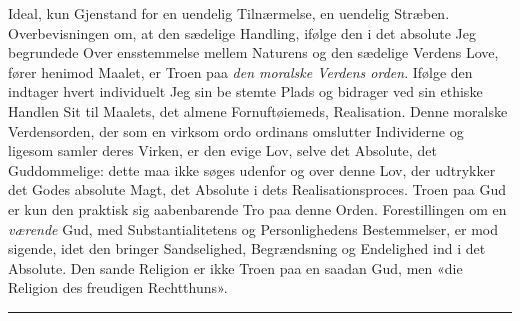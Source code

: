 \documentclass[12pt,a4paper]{book}
\newcommand{\divrule}{\begin{center}\rule{2cm}{0.4pt}\end{center}}
\begin{document}
Ideal, kun Gjenstand for en uendelig Tilnærmelse, en
uendelig Stræben. Overbevisningen om, at den sædelige
Handling, ifølge den i det absolute Jeg begrundede Over\-%
ensstemmelse mellem Naturens og den sædelige Verdens Love,
fører henimod Maalet, er Troen paa \emph{den moralske Verdens\-%
orden}. Ifølge den indtager hvert individuelt Jeg sin be\-%
stemte Plads og bidrager ved sin ethiske Handlen Sit til
Maalets, det almene Fornuftøiemeds, Realisation. Denne
moralske Verdensorden, der som en virksom ordo ordinans
omslutter Individerne og ligesom samler deres Virken, er den
evige Lov, selve det Absolute, det Guddommelige: dette maa
ikke søges udenfor og over denne Lov, der udtrykker det
Godes absolute Magt, det Absolute i dets Realisationsproces.
Troen paa Gud er kun den praktisk sig aabenbarende Tro paa
denne Orden. Forestillingen om en \emph{værende} Gud, med
Substantialitetens og Personlighedens Bestemmelser, er mod\-%
sigende, idet den bringer Sandselighed, Begrændsning og
Endelighed ind i det Absolute. Den sande Religion er ikke
Troen paa en saadan Gud, men «die Religion des freudigen
Rechtthuns».

\divrule
\end{document}

